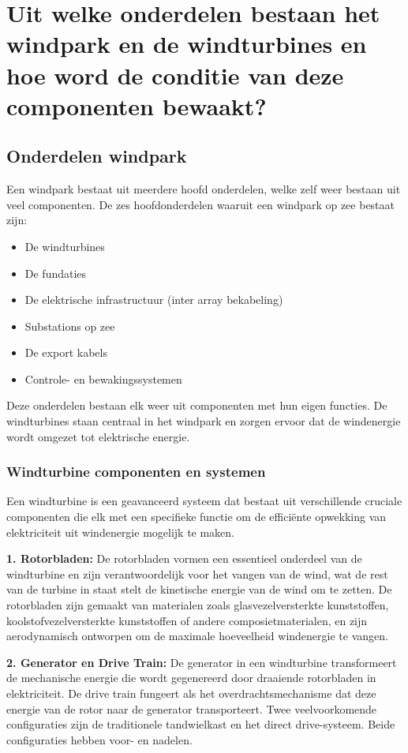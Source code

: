 \section{Uit welke onderdelen bestaan het windpark en de windturbines en hoe word de conditie van deze componenten bewaakt?}
\subsection{Onderdelen windpark}
Een windpark bestaat uit meerdere hoofd onderdelen, welke zelf weer bestaan uit veel componenten. De zes hoofdonderdelen waaruit een windpark op zee bestaat zijn: 
\begin{itemize}
    \item De windturbines
    \item De fundaties
    \item De elektrische infrastructuur (inter array bekabeling)
    \item Substations op zee
    \item De export kabels
    \item Controle- en bewakingssystemen
\end{itemize}
Deze onderdelen bestaan elk weer uit componenten met hun eigen functies. 
De windturbines staan centraal in het windpark en zorgen ervoor dat de windenergie wordt omgezet tot elektrische energie.


\subsubsection{Windturbine componenten en systemen}
Een windturbine is een geavanceerd systeem dat bestaat uit verschillende cruciale componenten die elk met een specifieke functie om de efficiënte opwekking van elektriciteit uit windenergie mogelijk te maken.

\textbf{1. Rotorbladen:}
De rotorbladen vormen een essentieel onderdeel van de windturbine en zijn verantwoordelijk voor het vangen van de wind, wat de rest van de turbine in staat stelt de kinetische energie van de wind om te zetten. De rotorbladen zijn gemaakt van materialen zoals glasvezelversterkte kunststoffen, koolstofvezelversterkte kunststoffen of andere composietmaterialen, en zijn aerodynamisch ontworpen om de maximale hoeveelheid windenergie te vangen.\cite{Rotorbladen}\cite{Rotorbladen_windturbinecomponenten}

\textbf{2. Generator en Drive Train:}
De generator in een windturbine transformeert de mechanische energie die wordt gegenereerd door draaiende rotorbladen in elektriciteit. De drive train fungeert als het overdrachtsmechanisme dat deze energie van de rotor naar de generator transporteert. Twee veelvoorkomende configuraties zijn de traditionele tandwielkast en het direct drive-systeem. Beide configuraties hebben voor- en nadelen.

